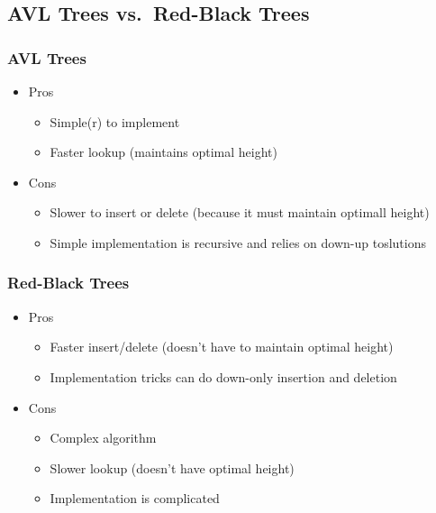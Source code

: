 \documentclass[
  10pt,
  english,
  letterpaper,
,tablecaptionabove
]{scrartcl}
\providecommand{\tightlist}{%
  \setlength{\itemsep}{0pt}\setlength{\parskip}{0pt}}
\begin{document}
\hypertarget{avl-trees-vs.-red-black-trees}{%
\subsection{AVL Trees vs.~Red-Black
Trees}\label{avl-trees-vs.-red-black-trees}}

\hypertarget{avl-trees}{%
\subsubsection{AVL Trees}\label{avl-trees}}

\begin{itemize}
\tightlist
\item
  Pros

  \begin{itemize}
  \tightlist
  \item
    Simple(r) to implement
  \item
    Faster lookup (maintains optimal height)
  \end{itemize}
\item
  Cons

  \begin{itemize}
  \tightlist
  \item
    Slower to insert or delete (because it must maintain optimall
    height)
  \item
    Simple implementation is recursive and relies on down-up toslutions
  \end{itemize}
\end{itemize}

\hypertarget{red-black-trees}{%
\subsubsection{Red-Black Trees}\label{red-black-trees}}

\begin{itemize}
\tightlist
\item
  Pros

  \begin{itemize}
  \tightlist
  \item
    Faster insert/delete (doesn't have to maintain optimal height)
  \item
    Implementation tricks can do down-only insertion and deletion
  \end{itemize}
\item
  Cons

  \begin{itemize}
  \tightlist
  \item
    Complex algorithm
  \item
    Slower lookup (doesn't have optimal height)
  \item
    Implementation is complicated
  \end{itemize}
\end{itemize}
\end{document}
